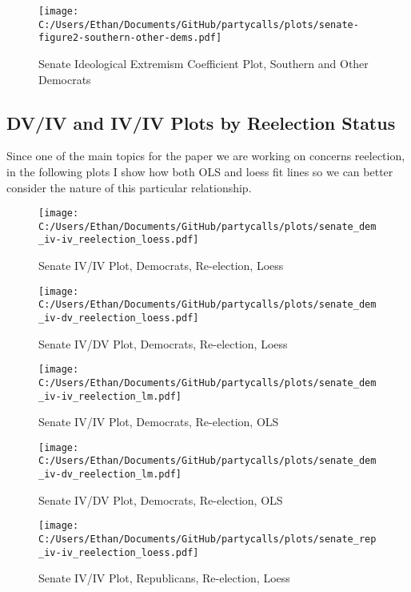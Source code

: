 \documentclass[12pt]{article}
\begin{document}
\begin{figure}[H]
	\centering
	\caption{Senate Ideological Extremism Coefficient Plot, Southern and Other Democrats}
	\texttt{[image: C:/Users/Ethan/Documents/GitHub/partycalls/plots/senate-figure2-southern-other-dems.pdf]}
\end{figure}

\subsection{DV/IV and IV/IV Plots by Reelection Status}

Since one of the main topics for the paper we are working on concerns reelection, in the following plots I show how both OLS and loess fit lines so we can better consider the nature of this particular relationship.

\begin{figure}[H]
	\centering
	\caption{Senate IV/IV Plot, Democrats, Re-election, Loess}
	\texttt{[image: C:/Users/Ethan/Documents/GitHub/partycalls/plots/senate\_dem\_iv-iv\_reelection\_loess.pdf]}
\end{figure}

\begin{figure}[H]
	\centering
	\caption{Senate IV/DV Plot, Democrats, Re-election, Loess}
	\texttt{[image: C:/Users/Ethan/Documents/GitHub/partycalls/plots/senate\_dem\_iv-dv\_reelection\_loess.pdf]}
\end{figure}

\begin{figure}[H]
	\centering
	\caption{Senate IV/IV Plot, Democrats, Re-election, OLS}
	\texttt{[image: C:/Users/Ethan/Documents/GitHub/partycalls/plots/senate\_dem\_iv-iv\_reelection\_lm.pdf]}
\end{figure}

\begin{figure}[H]
	\centering
	\caption{Senate IV/DV Plot, Democrats, Re-election, OLS}
	\texttt{[image: C:/Users/Ethan/Documents/GitHub/partycalls/plots/senate\_dem\_iv-dv\_reelection\_lm.pdf]}
\end{figure}

\begin{figure}[H]
	\centering
	\caption{Senate IV/IV Plot, Republicans, Re-election, Loess}
	\texttt{[image: C:/Users/Ethan/Documents/GitHub/partycalls/plots/senate\_rep\_iv-iv\_reelection\_loess.pdf]}
\end{figure}
\end{document}
